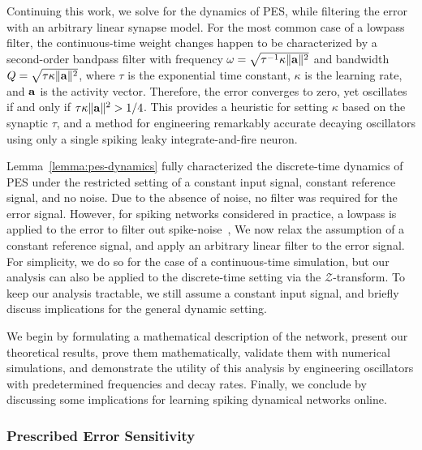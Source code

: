 Continuing this work, we solve for the dynamics of PES, while filtering the error with an arbitrary linear synapse model. 
For the most common case of a lowpass filter, the continuous-time weight changes happen to be characterized by a second-order bandpass filter with frequency $\omega = \sqrt{\tau^{-1} \kappa \|\mathbf{a}\|^2 }$ and bandwidth $Q = \sqrt{\tau \kappa \|\mathbf{a}\|^2 }$, where $\tau$ is the exponential time constant, $\kappa$ is the learning rate, and $\mathbf{a}$ is the activity vector.
Therefore, the error converges to zero, yet oscillates if and only if $\tau \kappa \|\mathbf{a}\|^2 > 1/4$.
This provides a heuristic for setting $\kappa$ based on the synaptic $\tau$, and a method for engineering remarkably accurate decaying oscillators using only a single spiking leaky integrate-and-fire neuron.

Lemma~\ref{lemma:pes-dynamics} fully characterized the discrete-time dynamics of PES under the restricted setting of a constant input signal, constant reference signal, and no noise.
Due to the absence of noise, no filter was required for the error signal.
However, for spiking networks considered in practice, a lowpass is applied to the error to filter out spike-noise~\citep[e.g.,][]{dewolf2016, rasmussen2017},  
We now relax the assumption of a constant reference signal, and apply an arbitrary linear filter to the error signal.
For simplicity, we do so for the case of a continuous-time simulation, but our analysis can also be applied to the discrete-time setting via the $\mathcal{Z}$-transform.
To keep our analysis tractable, we still assume a constant input signal, and briefly discuss implications for the general dynamic setting.

We begin by formulating a mathematical description of the network, present our theoretical results, prove them mathematically, validate them with numerical simulations, and demonstrate the utility of this analysis by engineering oscillators with predetermined frequencies and decay rates.
Finally, we conclude by discussing some implications for learning spiking dynamical networks online.

\subsubsection{Prescribed Error Sensitivity}


